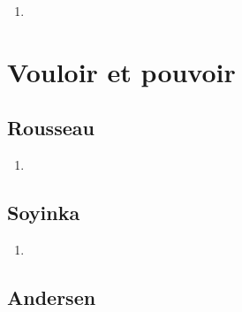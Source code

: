 \documentclass[a4paper, 11pt, hidelinks]{article}
\begin{document}
\begin{enumerate}
    \item 
\end{enumerate}

























































\section{Vouloir et pouvoir}



\subsection{Rousseau}


\begin{enumerate}
    \item 
\end{enumerate}



\subsection{Soyinka}


\begin{enumerate}
    \item 
\end{enumerate}




\subsection{Andersen}
\end{document}
